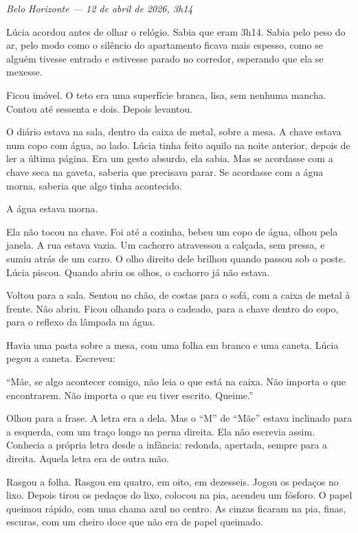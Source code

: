 
\noindent \textit{Belo Horizonte --- 12 de abril de 2026, 3h14}

\noindent Lúcia acordou antes de olhar o relógio. Sabia que eram 3h14. Sabia pelo peso do ar, pelo modo como o silêncio do apartamento ficava mais espesso, como se alguém tivesse entrado e estivesse parado no corredor, esperando que ela se mexesse.

\noindent Ficou imóvel. O teto era uma superfície branca, lisa, sem nenhuma mancha. Contou até sessenta e dois. Depois levantou.

\noindent O diário estava na sala, dentro da caixa de metal, sobre a mesa. A chave estava num copo com água, ao lado. Lúcia tinha feito aquilo na noite anterior, depois de ler a última página. Era um gesto absurdo, ela sabia. Mas se acordasse com a chave seca na gaveta, saberia que precisava parar. Se acordasse com a água morna, saberia que algo tinha acontecido.

\noindent A água estava morna.

\noindent Ela não tocou na chave. Foi até a cozinha, bebeu um copo de água, olhou pela janela. A rua estava vazia. Um cachorro atravessou a calçada, sem pressa, e sumiu atrás de um carro. O olho direito dele brilhou quando passou sob o poste. Lúcia piscou. Quando abriu os olhos, o cachorro já não estava.

\noindent Voltou para a sala. Sentou no chão, de costas para o sofá, com a caixa de metal à frente. Não abriu. Ficou olhando para o cadeado, para a chave dentro do copo, para o reflexo da lâmpada na água.

\noindent Havia uma pasta sobre a mesa, com uma folha em branco e uma caneta. Lúcia pegou a caneta. Escreveu:

\noindent ``Mãe, se algo acontecer comigo, não leia o que está na caixa. Não importa o que encontrarem. Não importa o que eu tiver escrito. Queime.''

\noindent Olhou para a frase. A letra era a dela. Mas o ``M'' de ``Mãe'' estava inclinado para a esquerda, com um traço longo na perna direita. Ela não escrevia assim. Conhecia a própria letra desde a infância: redonda, apertada, sempre para a direita. Aquela letra era de outra mão.

\noindent Rasgou a folha. Rasgou em quatro, em oito, em dezesseis. Jogou os pedaços no lixo. Depois tirou os pedaços do lixo, colocou na pia, acendeu um fósforo. O papel queimou rápido, com uma chama azul no centro. As cinzas ficaram na pia, finas, escuras, com um cheiro doce que não era de papel queimado.

